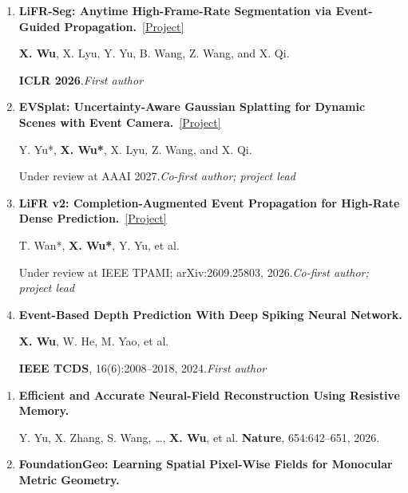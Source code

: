 \documentclass[a4paper]{article}
\newcommand{\pubgroup}[1]{%
  \par\vspace{2.0pt}{\color{cvblue}\fontsize{9.4}{10.4}\selectfont\bfseries #1}\par
}
\begin{document}
{\begin{enumerate}[leftmargin=1.6em,labelsep=0.38em,itemsep=0.4pt,topsep=1.3pt,parsep=0pt,partopsep=0pt]
Y. Yu*, \textbf{X. Wu*}, X. Hu, et al.\par
arXiv:2512.04519, 2025.\hfill\textcolor{cvblue}{\textit{Co-first author}}
\item \textbf{LiFR-Seg: Anytime High-Frame-Rate Segmentation via Event-Guided Propagation.}~\href{https://candy-crusher.github.io/xiaoshanwu.github.io/projects/lifr-seg/}{\textcolor{cvblue}{[Project]}}\par
\textbf{X. Wu}, X. Lyu, Y. Yu, B. Wang, Z. Wang, and X. Qi.\par
\textbf{ICLR 2026}.\hfill\textcolor{cvblue}{\textit{First author}}
\item \textbf{EVSplat: Uncertainty-Aware Gaussian Splatting for Dynamic Scenes with Event Camera.}~\href{https://candy-crusher.github.io/xiaoshanwu.github.io/projects/evsplat/}{\textcolor{cvblue}{[Project]}}\par
Y. Yu*, \textbf{X. Wu*\textdagger}, X. Lyu, Z. Wang, and X. Qi.\par
Under review at AAAI 2027.\hfill\textcolor{cvblue}{\textit{Co-first author; project lead}}
\item \textbf{LiFR v2: Completion-Augmented Event Propagation for High-Rate Dense Prediction.}~\href{https://candy-crusher.github.io/xiaoshanwu.github.io/projects/lifr-v2/}{\textcolor{cvblue}{[Project]}}\par
T. Wan*, \textbf{X. Wu*\textdagger}, Y. Yu, et al.\par
Under review at IEEE TPAMI; arXiv:2609.25803, 2026.\hfill\textcolor{cvblue}{\textit{Co-first author; project lead}}
\item \textbf{Event-Based Depth Prediction With Deep Spiking Neural Network.}\par
\textbf{X. Wu}, W. He, M. Yao, et al.\par
\textbf{IEEE TCDS}, 16(6):2008--2018, 2024.\hfill\textcolor{cvblue}{\textit{First author}}
\end{enumerate}
\pubgroup{Collaborative Work}
\begin{enumerate}[resume,leftmargin=1.6em,labelsep=0.38em,itemsep=0.4pt,topsep=1.3pt,parsep=0pt,partopsep=0pt]
\item \textbf{Efficient and Accurate Neural-Field Reconstruction Using Resistive Memory.}\par
Y. Yu, X. Zhang, S. Wang, \ldots, \textbf{X. Wu}, et al. \hfill \textbf{Nature}, 654:642--651, 2026.
\item \textbf{FoundationGeo: Learning Spatial Pixel-Wise Fields for Monocular Metric Geometry.}\par

\end{enumerate}}
\end{document}
